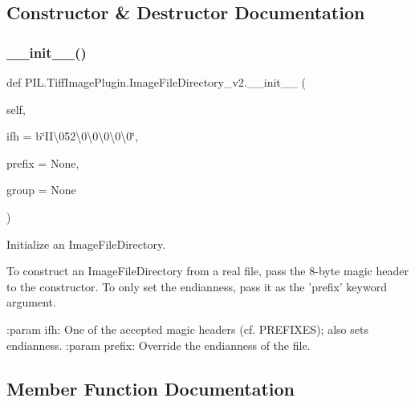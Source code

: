 \subsection{Constructor \& Destructor Documentation}
\mbox{\label{classPIL_1_1TiffImagePlugin_1_1ImageFileDirectory__v2_aae95cdd3aad5c230fdbe6b27e03e38c5}} 
\subsubsection{\texorpdfstring{\+\_\+\+\_\+init\+\_\+\+\_\+()}{\_\_init\_\_()}}
{\footnotesize\ttfamily def P\+I\+L.\+Tiff\+Image\+Plugin.\+Image\+File\+Directory\+\_\+v2.\+\_\+\+\_\+init\+\_\+\+\_\+ (\begin{DoxyParamCaption}\item[{}]{self,  }\item[{}]{ifh = {\ttfamily b\char`\"{}II\textbackslash{}052\textbackslash{}0\textbackslash{}0\textbackslash{}0\textbackslash{}0\textbackslash{}0\char`\"{}},  }\item[{}]{prefix = {\ttfamily None},  }\item[{}]{group = {\ttfamily None} }\end{DoxyParamCaption})}

\begin{DoxyVerb}Initialize an ImageFileDirectory.

To construct an ImageFileDirectory from a real file, pass the 8-byte
magic header to the constructor.  To only set the endianness, pass it
as the 'prefix' keyword argument.

:param ifh: One of the accepted magic headers (cf. PREFIXES); also sets
      endianness.
:param prefix: Override the endianness of the file.
\end{DoxyVerb}
 

\subsection{Member Function Documentation}
\mbox{\label{classPIL_1_1TiffImagePlugin_1_1ImageFileDirectory__v2_aa6c2acdc44209ccfa90f8726d6ae4a22}} 
